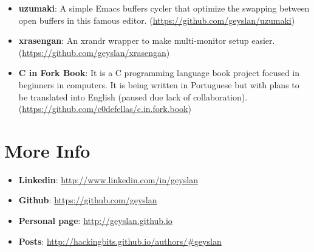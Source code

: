 \documentclass[margin]{res}
\begin{document}
\begin{resume}
\begin{itemize}
\item \textbf{uzumaki}: A simple Emacs buffers cycler that optimize the
  swapping between open buffers in this famous editor.\newline
  (\url{https://github.com/geyslan/uzumaki})\vspace{1mm}

\item \textbf{xrasengan}: An xrandr wrapper to make multi-monitor setup
  easier.\newline (\url{https://github.com/geyslan/xrasengan})\vspace{1mm}

\item \textbf{C in Fork Book}: It is a C programming language book project
  focused in beginners in computers. It is being written in Portuguese but with
  plans to be translated into English (paused due lack of collaboration).\newline
  (\url{https://github.com/c0defellas/c.in.fork.book})
\end{itemize}

\section{More Info}
\begin{itemize}
\item \textbf{Linkedin}: \url{http://www.linkedin.com/in/geyslan}
\item \textbf{Github}: \url{https://github.com/geyslan}
\item \textbf{Personal page}: \url{http://geyslan.github.io}
\item \textbf{Posts}: \url{http://hackingbits.github.io/authors/#geyslan}
\end{itemize}

\end{resume}
\end{document}
